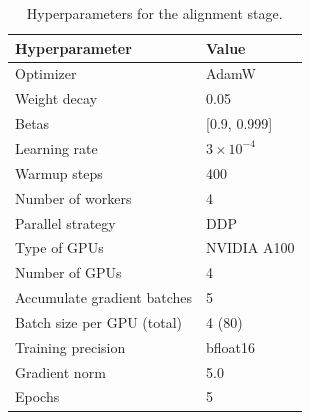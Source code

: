 \begin{table}[t!]
\centering
\small
\caption{Hyperparameters for the alignment stage.} \label{tab:param_align}
\begin{tabular}{@{}ll@{}}
\toprule
\textbf{Hyperparameter}  & \textbf{Value}   \\ \midrule
Optimizer                & AdamW     \\
Weight decay             & 0.05     \\
Betas                    & [0.9, 0.999]      \\
Learning rate            & $3\times 10^{-4}$ \\
Warmup steps             & 400      \\
Number of workers        & 4         \\
Parallel strategy        & DDP       \\
Type of GPUs             & NVIDIA A100       \\
Number of GPUs           & 4 \\
Accumulate gradient batches & 5      \\
Batch size per GPU (total)   & 4 (80)    \\ 
Training precision       & bfloat16 \\
Gradient norm            & 5.0        \\
Epochs                   & 5        \\
\bottomrule
\end{tabular}
\end{table}


